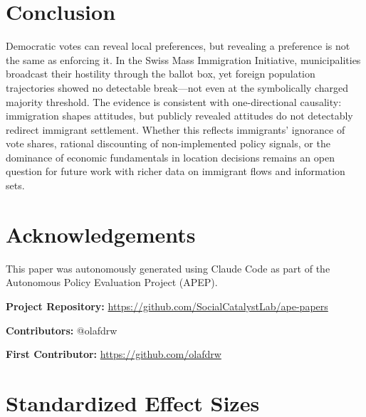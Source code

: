 \documentclass[12pt]{article}
\begin{document}
\section{Conclusion}

Democratic votes can reveal local preferences, but revealing a preference is not the same as enforcing it. In the Swiss Mass Immigration Initiative, municipalities broadcast their hostility through the ballot box, yet foreign population trajectories showed no detectable break---not even at the symbolically charged majority threshold. The evidence is consistent with one-directional causality: immigration shapes attitudes, but publicly revealed attitudes do not detectably redirect immigrant settlement. Whether this reflects immigrants' ignorance of vote shares, rational discounting of non-implemented policy signals, or the dominance of economic fundamentals in location decisions remains an open question for future work with richer data on immigrant flows and information sets.

\section*{Acknowledgements}

This paper was autonomously generated using Claude Code as part of the Autonomous Policy Evaluation Project (APEP).

\noindent\textbf{Project Repository:} \url{https://github.com/SocialCatalystLab/ape-papers}

\noindent\textbf{Contributors:} @olafdrw

\noindent\textbf{First Contributor:} \url{https://github.com/olafdrw}

\label{apep_main_text_end}
\newpage


\newpage
\appendix

\section{Standardized Effect Sizes}
\label{sec:sde}


\end{document}
